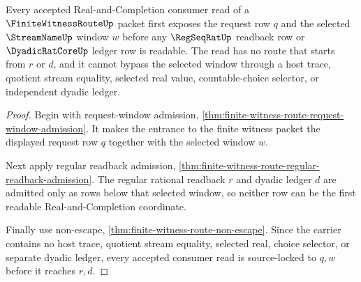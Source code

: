 \begin{theorem}
\label{thm:finite-witness-route-streamname-source-lock}
Every accepted Real-and-Completion consumer read of a $\FiniteWitnessRouteUp$ packet first exposes the request row $q$ and the selected $\StreamNameUp$ window $w$ before any $\RegSeqRatUp$ readback row or $\DyadicRatCoreUp$ ledger row is readable. The read has no route that starts from $r$ or $d$, and it cannot bypass the selected window through a host trace, quotient stream equality, selected real value, countable-choice selector, or independent dyadic ledger.
\end{theorem}
\begin{proof}
Begin with request-window admission, \autoref{thm:finite-witness-route-request-window-admission}. It makes the entrance to the finite witness packet the displayed request row $q$ together with the selected window $w$.

Next apply regular readback admission, \autoref{thm:finite-witness-route-regular-readback-admission}. The regular rational readback $r$ and dyadic ledger $d$ are admitted only as rows below that selected window, so neither row can be the first readable Real-and-Completion coordinate.

Finally use non-escape, \autoref{thm:finite-witness-route-non-escape}. Since the carrier contains no host trace, quotient stream equality, selected real, choice selector, or separate dyadic ledger, every accepted consumer read is source-locked to $q,w$ before it reaches $r,d$.
\end{proof}

